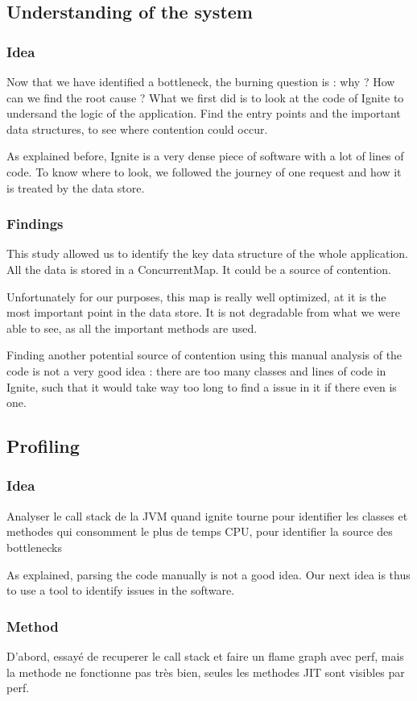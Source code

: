 \documentclass[conference]{IEEEtran}
\begin{document}
\subsection{Understanding of the system}
\subsubsection{Idea}
Now that we have identified a bottleneck, the burning question is : why ? How can we find the root cause ?
What we first did is to look at the code of Ignite to undersand the logic of the application. Find the entry points and the important data structures, to see where contention could occur.

As explained before, Ignite is a very dense piece of software with a lot of lines of code. To know where to look, we followed the journey of one request and how it is treated by the data store.

\subsubsection{Findings}
This study allowed us to identify the key data structure of the whole application. All the data is stored in a ConcurrentMap. It could be a source of contention.

Unfortunately for our purposes, this map is really well optimized, at it is the most important point in the data store. It is not degradable from what we were able to see, as all the important methods are used. 

Finding another potential source of contention using this manual analysis of the code is not a very good idea : there are too many classes and lines of code in Ignite, such that it would take way too long to find a issue in it if there even is one. 

\subsection{Profiling}
\subsubsection{Idea}
Analyser le call stack de la JVM quand ignite tourne pour identifier les classes et methodes qui consomment le plus de temps CPU, pour identifier la source des bottlenecks

As explained, parsing the code manually is not a good idea. Our next idea is thus to use a tool to identify issues in the software.
\subsubsection{Method}
D'abord, essayé de recuperer le call stack et faire un flame graph avec perf, mais la methode ne fonctionne pas très bien, seules les methodes JIT sont visibles par perf.
\end{document}
